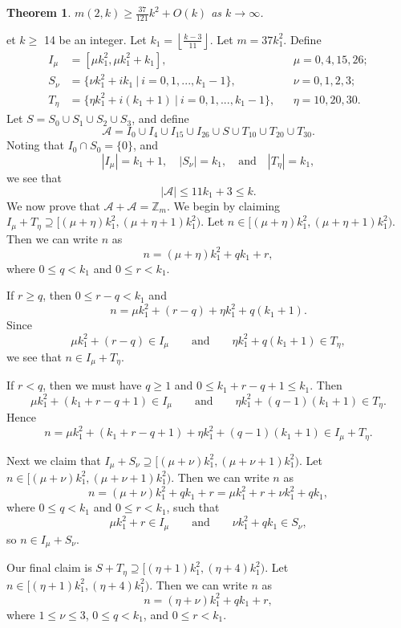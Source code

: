 \documentclass[11pt]{article}
\newtheorem{theorem}{Theorem}[section]
\theoremstyle{definition}
\def\Z{\mbox{$\mathbb Z$}}
\begin{document}
\begin{theorem}\label{thm:m(2k)}
$\displaystyle m(2,k) \geq \frac{37}{121}k^2 + O(k)$  as $ k \to \infty$.
\end{theorem}
et $k \geq$ 14 be an integer. Let $\displaystyle k_1 = \left \lfloor \frac{k - 3}{11} \right \rfloor$. Let $m = 37k_1^2$.  Define 
\begin{align*}
I_\mu &= [\mu k_1^2, \mu k_1^2 + k_1],
&&\mu = 0, 4, 15, 26; \\
S_\nu &= \{\nu k_1^2 + ik_1 \ |\  i = 0 , 1, ... , k_1 - 1\},
&&\nu = 0, 1, 2, 3;\\
T_{\eta} &= \{\eta k_1^2+ i(k_1 + 1) \ |\   i = 0 , 1, ... , k_1 -1\},
&&\eta = 10, 20, 30.
\end{align*}
 Let $S= S_{0} \cup S_{1} \cup S_{2} \cup S_{3}$, and
define
\[
\mathscr{A}=I_0\cup I_4\cup I_{15}\cup I_{26}\cup S\cup T_{10}\cup T_{20}\cup T_{30}.
\]
Noting  that $I_0\cap S_0=\{0\}$, and 
\[
|I_\mu| = k_1 + 1,\quad 
|S_\nu| = k_1,\quad\text{and}\quad
|T_\eta| = k_1,
\]
we see that 
\[
|\mathscr{A|} \leq 11k_1 + 3 \leq k.
\]  
We now prove that $\mathscr{A}+\mathscr{A}=\Z_m$.
We begin by claiming $I_{\mu}+T_{\eta}\supseteq[(\mu + \eta )k_1^2 ,  (\mu + \eta  + 1)k_1^2)$. Let $n \in[(\mu + \eta )k_1^2 ,  (\mu + \eta  + 1)k_1^2)$.
Then we can write $n$ as 
\[
n = (\mu + \eta ) k_1^2 + qk_1 + r,
\]
where $0 \leq q < k_1$ and $0 \leq r < k_1$.

If $r \geq q$, then $0\le r-q<k_{1}$ and
\[
n = \mu k_1^2 +  (r - q)+ \eta k_1^2 + q(k_1+1).
\]
 Since 
 \[
 \mu k_1^2 + (r - q) \in I_\mu\qquad\text{and}\qquad \eta k_1^2 +q(k_1+1) \in T_\eta,
 \]
we see that $n \in I_{\mu}+T_{\eta}$. 

If $r < q$, then we must have $q \geq 1$ and $0\le k_{1}+r-q+1\le k_{1}$. Then
\[
\mu k_1^2 + (k_1 + r - q + 1) \in I_\mu \qquad \text{and}\qquad
\eta k_1^2 + (q - 1)(k_1 + 1) \in T_\eta.
\]
 Hence
\[
n = \mu k_1^2 + (k_1 + r - q + 1)+\eta k_1^2 + (q - 1)(k_1 + 1) \in I_{\mu}+T_{\eta}.
\]
 

Next we claim that  $I_{\mu}+S_{\nu}\supseteq[(\mu + \nu )k_1^2 ,  (\mu + \nu  + 1)k_1^2)$. Let $n \in[(\mu + \nu )k_1^2 ,  (\mu + \nu  + 1)k_1^2)$.
Then we can write $n$ as 
\[
n = (\mu + \nu ) k_1^2 + qk_1 + r = \mu k_1^2 + r+\nu k_1^2 + qk_1,
\]
where  $0 \leq q < k_1$ and $0 \leq r < k_1$, such that 
\[
\mu k_1^2 + r \in I_\mu \qquad\text{and}\qquad\nu k_1^2 + qk_1 \in S_\nu,
\]
 so $n \in I_{\mu}+S_{\nu}$. 

Our final claim is $S+T_\eta \supseteq[(\eta  +1)k_1^2 ,  (\eta  + 4)k_1^2)$.  Let $n \in[(\eta  +1)k_1^2 ,  (\eta  + 4)k_1^2)$.
Then we can write $n$ as 
\[
n = (\eta  + \nu ) k_1^2 + qk_1 + r, 
\]
where $1 \leq \nu  \leq 3$, $0 \leq q < k_1$, and $0 \leq r < k_1$. 
\end{document}

